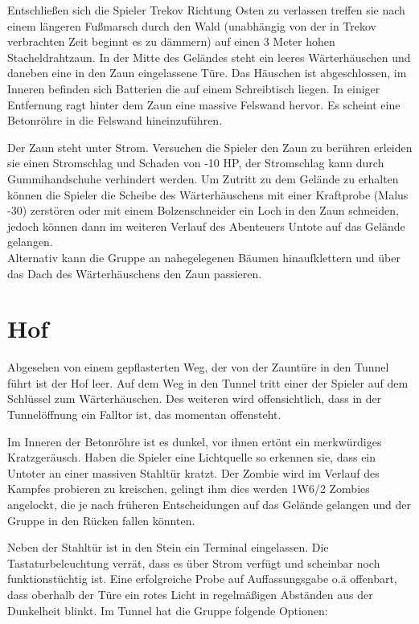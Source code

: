 
Entschließen sich die Spieler Trekov Richtung Osten zu verlassen treffen sie nach einem längeren Fußmarsch durch den Wald (unabhängig von der in Trekov verbrachten Zeit beginnt es zu dämmern) auf einen 3 Meter hohen Stacheldrahtzaun.
In der Mitte des Geländes steht ein leeres Wärterhäuschen und daneben eine in den Zaun eingelassene Türe. Das Häuschen ist abgeschlossen, im Inneren befinden sich Batterien die auf einem Schreibtisch liegen.
In einiger Entfernung ragt hinter dem Zaun eine massive Felswand hervor. Es scheint eine Betonröhre in die Felswand hineinzuführen.

Der Zaun steht unter Strom. Versuchen die Spieler den Zaun zu berühren erleiden sie einen Stromschlag und Schaden von -10 HP, der Stromschlag kann durch Gummihandschuhe verhindert werden.
Um Zutritt zu dem Gelände zu erhalten können die Spieler die Scheibe des Wärterhäuschens mit einer Kraftprobe (Malus -30) zerstören oder mit einem Bolzenschneider ein Loch in den Zaun schneiden, jedoch können dann im weiteren Verlauf des Abenteuers Untote auf das Gelände gelangen.
\\Alternativ kann die Gruppe an nahegelegenen Bäumen hinaufklettern und über das Dach des Wärterhäuschens den Zaun passieren.

\section{Hof}

Abgesehen von einem gepflasterten Weg, der von der Zauntüre in den Tunnel führt ist der Hof leer. Auf dem Weg in den Tunnel tritt einer der Spieler auf dem Schlüssel zum Wärterhäuschen. Des weiteren wird offensichtlich, dass in der Tunnelöffnung ein Falltor ist, das momentan offensteht.

Im Inneren der Betonröhre ist es dunkel, vor ihnen ertönt ein merkwürdiges Kratzgeräusch. Haben die Spieler eine Lichtquelle so erkennen sie, dass ein Untoter an einer massiven Stahltür kratzt.
Der Zombie wird im Verlauf des Kampfes probieren zu kreischen, gelingt ihm dies werden 1W6/2 Zombies angelockt, die je nach früheren Entscheidungen auf das Gelände gelangen und der Gruppe in den Rücken fallen könnten.


%  

Neben der Stahltür ist in den Stein ein Terminal eingelassen. Die Tastaturbeleuchtung verrät, dass es über Strom verfügt und scheinbar noch funktionstüchtig ist.
Eine erfolgreiche Probe auf Auffassungsgabe o.ä offenbart, dass oberhalb der Türe ein rotes Licht in regelmäßigen Abständen aus der Dunkelheit blinkt.
Im Tunnel hat die Gruppe folgende Optionen:

